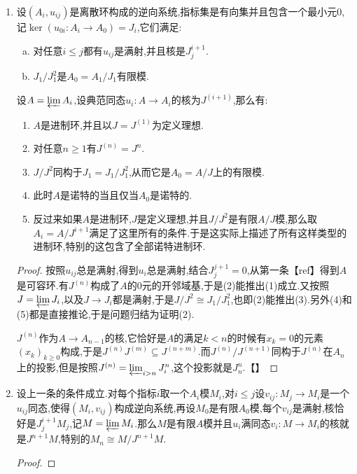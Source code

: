 \begin{enumerate}
\begin{proof}
		条件保证了$A$的$J$-adic拓扑是完备的,于是$A$是诺特的等价于讲$\mathrm{gr}^J(A)$是诺特的.
	\end{proof}
    \item 设$(A_i,u_{ij})$是离散环构成的逆向系统,指标集是有向集并且包含一个最小元0,记$\ker\left(u_{0i}:A_i\to A_0\right)=J_i$,它们满足:
    \begin{enumerate}[(a)]
    	\item 对任意$i\le j$都有$u_{ij}$是满射,并且核是$J_j^{i+1}$.
    	\item $J_1/J_1^2$是$A_0=A_1/J_1$有限模.
    \end{enumerate}
    
    设$A=\varprojlim A_i$,设典范同态$u_i:A\to A_i$的核为$J^{(i+1)}$,那么有:
    \begin{enumerate}[(1)]
    	\item $A$是进制环,并且以$J=J^{(1)}$为定义理想.
    	\item 对任意$n\ge1$有$J^{(n)}=J^n$.
    	\item $J/J^2$同构于$J_1=J_1/J_1^2$,从而它是$A_0=A/J$上的有限模.
    	\item 此时$A$是诺特的当且仅当$A_0$是诺特的.
    	\item 反过来如果$A$是进制环,$J$是定义理想,并且$J/J^2$是有限$A/J$模,那么取$A_i=A/J^{i+1}$满足了这里所有的条件.于是这实际上描述了所有这样类型的进制环,特别的这包含了全部诺特进制环.
    \end{enumerate}
    \begin{proof}
    	
    	按照$u_{ij}$总是满射,得到$u_i$总是满射,结合$J_j^{j+1}=0$,从第一条【ref】得到$A$是可容环.有$J^{(n)}$构成了$A$的0元的开邻域基,于是(2)能推出(1)成立.又按照$J=\varprojlim J_i$,以及$J\to J_i$都是满射,于是$J/J^2\cong J_1/J_1^2$,也即(2)能推出(3).另外(4)和(5)都是直接推论,于是问题归结为证明(2).
    	
    	\qquad
    	
    	$J^{(n)}$作为$A\to A_{n-1}$的核,它恰好是$A$的满足$k<n$的时候有$x_k=0$的元素$(x_k)_{k\ge0}$构成,于是$J^{(n)}J^{(m)}\subseteq J^{(n+m)}$.而$J^{(n)}/J^{(n+1)}$同构于$J^{(n)}$在$A_n$上的投影,但是按照$J^{(n)}=\varprojlim_{i>n}J_i^n$,这个投影就是$J_n^n$.【】
    	
    \end{proof}
    \item 设上一条的条件成立.对每个指标$i$取一个$A_i$模$M_i$,对$i\le j$设$v_{ij}:M_j\to M_i$是一个$u_{ij}$同态,使得$(M_i,v_{ij})$构成逆向系统,再设$M_0$是有限$A_0$模,每个$v_{ij}$是满射,核恰好是$J_j^{i+1}M_j$,记$M=\varprojlim M_i$.那么$M$是有限$A$模并且$u_i$满同态$v_i:M\to M_i$的核就是$J^{n+1}M$,特别的$M_n\cong M/J^{n+1}M$.
    \begin{proof}
    	

\end{proof}
\end{enumerate}

